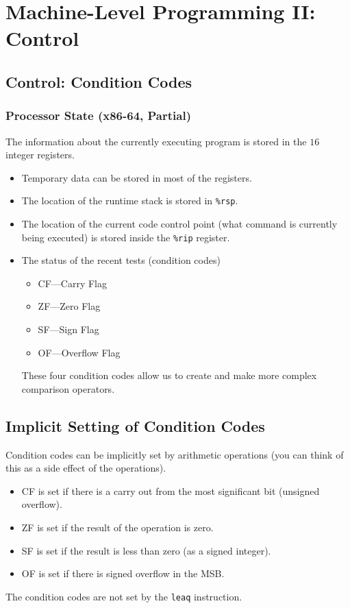 \documentclass[class=article, crop=false]{standalone}
\begin{document}
  \section{Machine-Level Programming II: Control}
  \subsection{Control: Condition Codes}
  \subsubsection{Processor State (x86-64, Partial)}
  The information about the currently executing program is stored in the $16$ integer registers.
  \begin{itemize}
    \item Temporary data can be stored in most of the registers.
    \item The location of the runtime stack is stored in \texttt{\%rsp}.
    \item The location of the current code control point (what command is currently being executed) is stored inside the \texttt{\%rip} register.
    \item The status of the recent tests (condition codes)
    \begin{itemize}
      \item CF---Carry Flag
      \item ZF---Zero Flag
      \item SF---Sign Flag
      \item OF---Overflow Flag
    \end{itemize}
    These four condition codes allow us to create and make more complex comparison operators.
  \end{itemize}
  \subsection{Implicit Setting of Condition Codes}
  Condition codes can be implicitly set by arithmetic operations (you can think of this as a side effect of the operations).
  \begin{itemize}
    \item CF is set if there is a carry out from the most significant bit (unsigned overflow).
    \item ZF is set if the result of the operation is zero.
    \item SF is set if the result is less than zero (as a signed integer).
    \item OF is set if there is signed overflow in the MSB.
  \end{itemize}
  The condition codes are not set by the \texttt{leaq} instruction.
\end{document}
